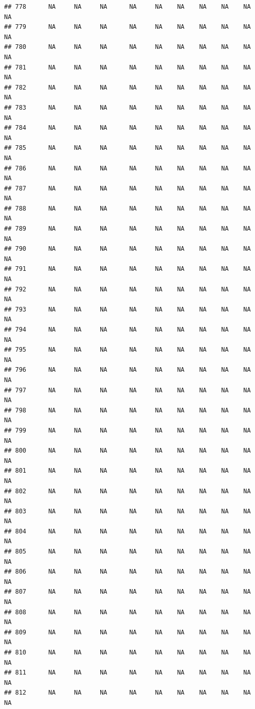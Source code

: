 \documentclass{article}\usepackage{graphicx, color}
\makeatletter
\newenvironment{kframe}{%
 \def\at@end@of@kframe{}%
 \ifinner\ifhmode%
  \def\at@end@of@kframe{\end{minipage}}%
  \begin{minipage}{\columnwidth}%
 \fi\fi%
 \def\FrameCommand##1{\hskip\@totalleftmargin \hskip-\fboxsep
 \colorbox{shadecolor}{##1}\hskip-\fboxsep
     \hskip-\linewidth \hskip-\@totalleftmargin \hskip\columnwidth}%
 \MakeFramed {\advance\hsize-\width
   \@totalleftmargin\z@ \linewidth\hsize
   \@setminipage}}%
 {\par\unskip\endMakeFramed%
 \at@end@of@kframe}
\newenvironment{knitrout}{}{} %
\makeatother
\begin{document}
\begin{knitrout}
\begin{kframe}
\begin{verbatim}
## 778      NA     NA     NA      NA     NA    NA    NA    NA    NA     NA
## 779      NA     NA     NA      NA     NA    NA    NA    NA    NA     NA
## 780      NA     NA     NA      NA     NA    NA    NA    NA    NA     NA
## 781      NA     NA     NA      NA     NA    NA    NA    NA    NA     NA
## 782      NA     NA     NA      NA     NA    NA    NA    NA    NA     NA
## 783      NA     NA     NA      NA     NA    NA    NA    NA    NA     NA
## 784      NA     NA     NA      NA     NA    NA    NA    NA    NA     NA
## 785      NA     NA     NA      NA     NA    NA    NA    NA    NA     NA
## 786      NA     NA     NA      NA     NA    NA    NA    NA    NA     NA
## 787      NA     NA     NA      NA     NA    NA    NA    NA    NA     NA
## 788      NA     NA     NA      NA     NA    NA    NA    NA    NA     NA
## 789      NA     NA     NA      NA     NA    NA    NA    NA    NA     NA
## 790      NA     NA     NA      NA     NA    NA    NA    NA    NA     NA
## 791      NA     NA     NA      NA     NA    NA    NA    NA    NA     NA
## 792      NA     NA     NA      NA     NA    NA    NA    NA    NA     NA
## 793      NA     NA     NA      NA     NA    NA    NA    NA    NA     NA
## 794      NA     NA     NA      NA     NA    NA    NA    NA    NA     NA
## 795      NA     NA     NA      NA     NA    NA    NA    NA    NA     NA
## 796      NA     NA     NA      NA     NA    NA    NA    NA    NA     NA
## 797      NA     NA     NA      NA     NA    NA    NA    NA    NA     NA
## 798      NA     NA     NA      NA     NA    NA    NA    NA    NA     NA
## 799      NA     NA     NA      NA     NA    NA    NA    NA    NA     NA
## 800      NA     NA     NA      NA     NA    NA    NA    NA    NA     NA
## 801      NA     NA     NA      NA     NA    NA    NA    NA    NA     NA
## 802      NA     NA     NA      NA     NA    NA    NA    NA    NA     NA
## 803      NA     NA     NA      NA     NA    NA    NA    NA    NA     NA
## 804      NA     NA     NA      NA     NA    NA    NA    NA    NA     NA
## 805      NA     NA     NA      NA     NA    NA    NA    NA    NA     NA
## 806      NA     NA     NA      NA     NA    NA    NA    NA    NA     NA
## 807      NA     NA     NA      NA     NA    NA    NA    NA    NA     NA
## 808      NA     NA     NA      NA     NA    NA    NA    NA    NA     NA
## 809      NA     NA     NA      NA     NA    NA    NA    NA    NA     NA
## 810      NA     NA     NA      NA     NA    NA    NA    NA    NA     NA
## 811      NA     NA     NA      NA     NA    NA    NA    NA    NA     NA
## 812      NA     NA     NA      NA     NA    NA    NA    NA    NA     NA

\end{verbatim}
\end{kframe}
\end{knitrout}
\end{document}
